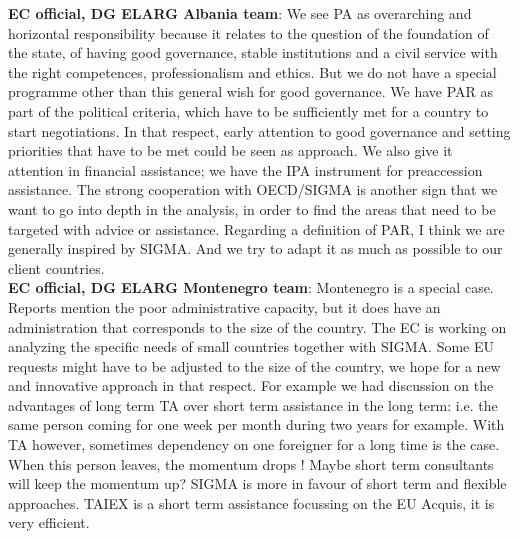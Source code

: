 \textbf{EC official, DG ELARG Albania team}: We see PA as overarching and horizontal responsibility because it relates to the question of the foundation of the state, of having good governance, stable institutions and a civil service with the right competences, professionalism and ethics. But we do not have a special programme other than this general wish for good governance. We have PAR as part of the political criteria, which have to be sufficiently met for a country to start negotiations. In that respect, early attention to good governance and setting priorities that have to be met could be seen as approach. We also give it attention in financial assistance; we have the IPA instrument for preaccession assistance. The strong cooperation with OECD/SIGMA is another sign that we want to go into depth in the analysis, in order to find the areas that need to be targeted with advice or assistance. Regarding a definition of PAR, I think we are generally inspired by SIGMA. And we try to adapt it as much as 
possible to our client countries.\\
\textbf{EC official, DG ELARG  Montenegro team}: Montenegro is a special case. Reports mention the poor administrative capacity, but it does have an administration that corresponds to the size of the country. The EC is working on analyzing the specific needs of small countries together with SIGMA. Some EU requests might have to be adjusted to the size of the country, we hope for a new and innovative approach in that respect. For example we had discussion on the advantages of long term TA over  short term assistance in the long term: i.e. the same person coming for one week per month during two years for example. With TA however, sometimes dependency on one foreigner for a long time is the case. When this person leaves, the momentum drops ! Maybe short term consultants will keep the momentum up? SIGMA is more in favour of short term and flexible approaches. TAIEX is a short term assistance focussing on the EU Acquis, it is very efficient.\\

